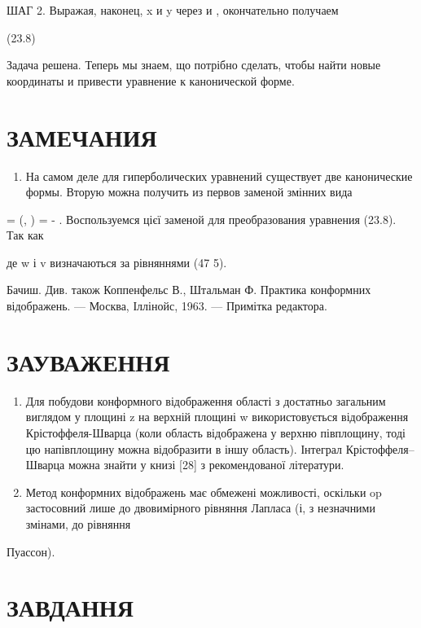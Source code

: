 \documentclass[
  ukrainian,
]{article}
\providecommand{\tightlist}{%
  \setlength{\itemsep}{0pt}\setlength{\parskip}{0pt}}
\begin{document}
ШАГ 2. Выражая, наконец, x и y через \xi  и \eta  , окончательно
получаем

(23.8)

Задача решена. Теперь мы знаем, що потрібно сделать, чтобы найти новые
координаты и привести уравнение к канонической форме.

\section{ЗАМЕЧАНИЯ}\label{ux437ux430ux43cux435ux447ux430ux43dux438ux44f-7}

\begin{enumerate}
\def\labelenumi{\arabic{enumi}.}
\tightlist
\item
  На самом деле для гиперболических уравнений существует две
  канонические формы. Вторую можна получить из первов заменой змінних
  вида
\end{enumerate}

\beta = \beta (\xi, \eta) = \xi - \eta. Воспользуемся цієї заменой для
преобразования уравнения (23.8). Так как

де w і v визначаються за рівняннями (47 5).

Бачиш. Див. також Коппенфельс В., Штальман Ф. Практика конформних
відображень. --- Москва, Іллінойс, 1963. --- Примітка редактора.

\section{ЗАУВАЖЕННЯ}\label{ux437ux430ux443ux432ux430ux436ux435ux43dux43dux44f-8}

\begin{enumerate}
\def\labelenumi{\arabic{enumi}.}
\item
  Для побудови конформного відображення області з достатньо загальним
  виглядом у площині z на верхній площині w використовується
  відображення Крістоффеля-Шварца (коли область відображена у верхню
  півплощину, тоді цю напівплощину можна відобразити в іншу область).
  Інтеграл Крістоффеля--Шварца можна знайти у книзі {[}28{]} з
  рекомендованої літератури.
\item
  Метод конформних відображень має обмежені можливості, оскільки op
  застосовний лише до двовимірного рівняння Лапласа (і, з незначними
  змінами, до рівняння
\end{enumerate}

Пуассон).

\section{ЗАВДАННЯ}\label{ux437ux430ux432ux434ux430ux43dux43dux44f-11}
\end{document}
